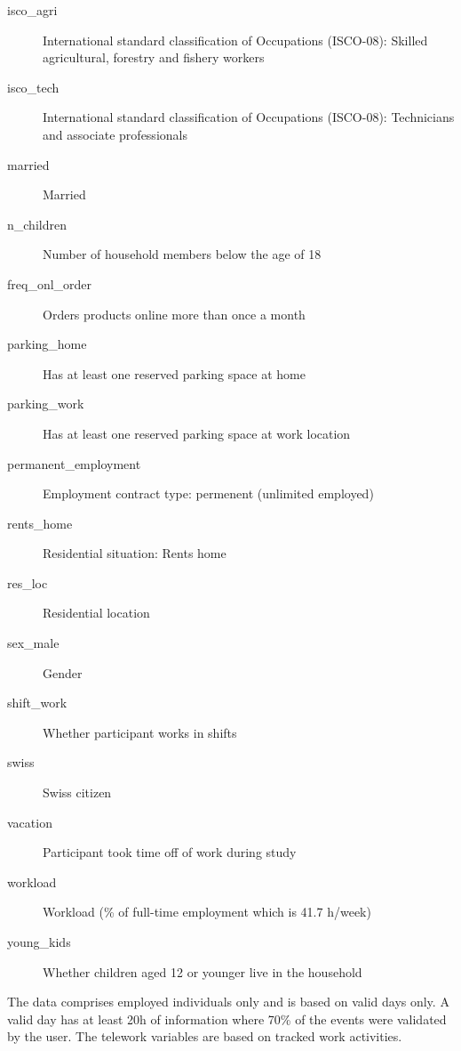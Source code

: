 \begin{Format}
\begin{description}
\item[isco\_agri] International standard classification of Occupations (ISCO-08): Skilled agricultural, forestry and fishery workers
\item[isco\_tech] International standard classification of Occupations (ISCO-08): Technicians and associate professionals
\item[married] Married
\item[n\_children] Number of household members below the age of 18
\item[freq\_onl\_order] Orders products online more than once a month
\item[parking\_home] Has at least one reserved parking space at home
\item[parking\_work] Has at least one reserved parking space at work location
\item[permanent\_employment] Employment contract type: permenent (unlimited employed)
\item[rents\_home] Residential situation: Rents home
\item[res\_loc] Residential location
\item[sex\_male] Gender
\item[shift\_work] Whether participant works in shifts
\item[swiss] Swiss citizen
\item[vacation] Participant took time off of work during study
\item[workload] Workload (\% of full-time employment which is 41.7 h/week)
\item[young\_kids] Whether children aged 12 or younger live in the household

\end{description}

\end{Format}
%
\begin{Details}
The data comprises employed individuals only and is based on valid days only.
A valid day has at least 20h of information where 70\% of the events were
validated by the user. The telework variables are based on tracked work activities.
\end{Details}
%
\begin{References}
\end{References}

